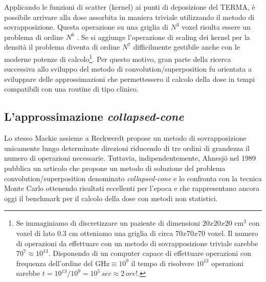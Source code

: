 {Applicando le funzioni di scatter (kernel) ai punti di deposizione del TERMA, è possibile arrivare alla dose assorbita in maniera triviale utilizzando il metodo di sovrapposizione. Questa operazione su una griglia di $N^3$ voxel risulta essere un problema  di ordine $N^6$ \cite{Ahnesjo1999}. Se si aggiunge l'operazione di scaling dei kernel per la densità il problema diventa di ordine $N^7$ difficilmente gestibile anche con le moderne potenze di calcolo\footnote{Se immaginiamo di discretizzare un paziente di dimensioni $20x20x20$ cm$^3$ con voxel di lato $0.3$ cm otteniamo una griglia di circa $70x70x70$ voxel. Il numero di operazioni da effettuare con un metodo di sovrapposizione triviale sarebbe $70^7\approx 10^{13}$. Disponendo di un computer capace di effettuare operazioni con frequenza dell'ordine del GHz$\equiv 10^9$ il tempo di risolvere $10^{13}$ operazioni sarebbe $t=10^{13}/10^9=10^5\,sec\approx 2\, ore!$.}. Per questo motivo, gran parte della ricerca successiva allo sviluppo del metodo di convolution/superposition fu orientata a sviluppare delle approssimazioni che permettessero il calcolo della dose in tempi compatibili con una routine di tipo clinico.

\subsection{L'approssimazione \textit{collapsed-cone}}
Lo stesso Mackie assieme a Reckwerdt \cite{Reckwerdt1992} propose un metodo di sovrapposizione unicamente lungo determinate direzioni riducendo di tre ordini di grandezza il numero di operazioni necessarie. Tuttavia, indipendentemente, Ahnesj\"{o} nel 1989 pubblica un articolo \cite{Ahnesjo1989} che propone un metodo di soluzione del problema convolution/superposition denominato \textit{collapsed-cone} e lo confronta con la tecnica Monte Carlo ottenendo risultati eccellenti per l'epoca e che rappresentano ancora oggi il benchmark per il calcolo della dose con metodi non statistici.

}
